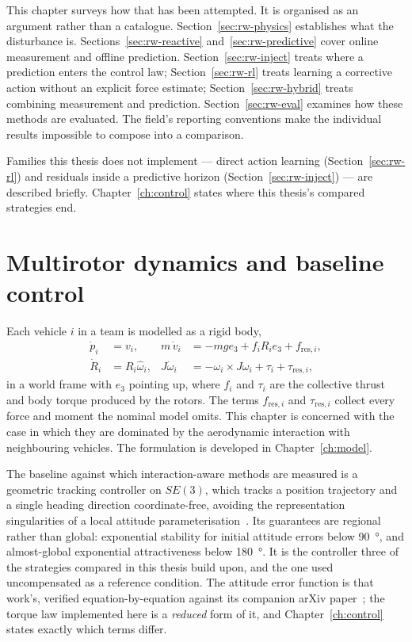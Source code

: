 This chapter surveys how that has been attempted. It is organised as an argument rather than a
catalogue. Section~\ref{sec:rw-physics} establishes what the disturbance is.
Sections~\ref{sec:rw-reactive} and~\ref{sec:rw-predictive} cover online measurement and offline
prediction. Section~\ref{sec:rw-inject} treats where a prediction enters the control law;
Section~\ref{sec:rw-rl} treats learning a corrective action without an explicit force estimate;
Section~\ref{sec:rw-hybrid} treats combining measurement and prediction.
Section~\ref{sec:rw-eval} examines how these methods are evaluated. The field's reporting
conventions make the individual results impossible to compose into a comparison.

Families this thesis does not implement --- direct action learning (Section~\ref{sec:rw-rl}) and
residuals inside a predictive horizon (Section~\ref{sec:rw-inject}) --- are described briefly.
Chapter~\ref{ch:control} states where this thesis's compared strategies end.

\section{Multirotor dynamics and baseline control}
\label{sec:rw-baseline}

Each vehicle $i$ in a team is modelled as a rigid body,
%
\begin{align}
  \dot{p}_i &= v_i, &
  m\,\dot{v}_i &= -m g e_3 + f_i R_i e_3 + f_{\mathrm{res},i}, \label{eq:rw-trans}\\
  \dot{R}_i &= R_i \hat{\omega}_i, &
  J\dot{\omega}_i &= -\omega_i \times J\omega_i + \tau_i + \tau_{\mathrm{res},i},
  \label{eq:rw-rot}
\end{align}
%
in a world frame with $e_3$ pointing up, where $f_i$ and $\tau_i$ are the collective thrust and
body torque produced by the rotors. The
terms $f_{\mathrm{res},i}$ and $\tau_{\mathrm{res},i}$ collect every force and moment the nominal
model omits. This chapter is concerned with the case in which they are dominated by the
aerodynamic interaction with neighbouring vehicles. The formulation is developed in
Chapter~\ref{ch:model}.

The baseline against which interaction-aware methods are measured is a geometric tracking
controller on $SE(3)$, which tracks a position trajectory and a single heading direction
coordinate-free, avoiding the representation singularities of a local attitude
parameterisation~\cite{lee2010geometrictracking}. Its guarantees are regional rather than global:
exponential stability for initial attitude errors below \SI{90}{\degree}, and almost-global
exponential attractiveness below \SI{180}{\degree}. It is the controller three of the
strategies compared in this thesis build upon, and the one used uncompensated as a reference
condition. The attitude error function is that work's, verified equation-by-equation against its
companion arXiv paper~\cite{lee2010geometricse3}; the torque law implemented here is a
\emph{reduced} form of it, and Chapter~\ref{ch:control} states exactly which terms differ.

